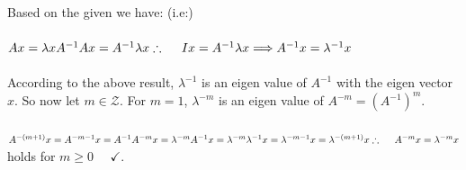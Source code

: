 \documentclass[fleqn]{article}
\begin{document}
\begin{enumerate}
      \textcolor{hwColor}{
        Based on the given we have: (i.e:)
        \\
        \\
        $
          Ax=\lambda x
          \\
          \\
          A^{-1} Ax=A^{-1} \lambda x
          \\
          \\
          \therefore ~~~~ Ix=A^{-1} \lambda x \Longrightarrow A^{-1} x=\lambda^{-1} x
        $ 
        \\
        \\
        According to the above result, $\lambda^{-1}$ is an eigen value of $A^{-1}$ with
        the eigen vector $x$. So now let $m \in \mathcal{Z}$. For $m=1$, $\lambda^{-m}$ is an 
        eigen value of $A^{-m}=(A^{-1})^m$.
        \\
        \\
        $
          A^{-(m+1)}x=A^{-m-1} x
          \\
          \\
          =A^{-1} A^{-m}x
          \\
          \\
          =\lambda^{-m} A^{-1} x
          \\
          \\
          =\lambda^{-m} \lambda^{-1} x
          \\
          \\
          =\lambda^{-m-1}x
          \\
          \\
          =\lambda^{-(m+1)} x
          \\
          \\
          \\
          \therefore ~~~~ A^{-m} x=\lambda^{-m} x
        $
        holds for $m \geqslant 0 ~~~~~~ \checkmark$. 
      }

  \end{enumerate}
\end{document}
